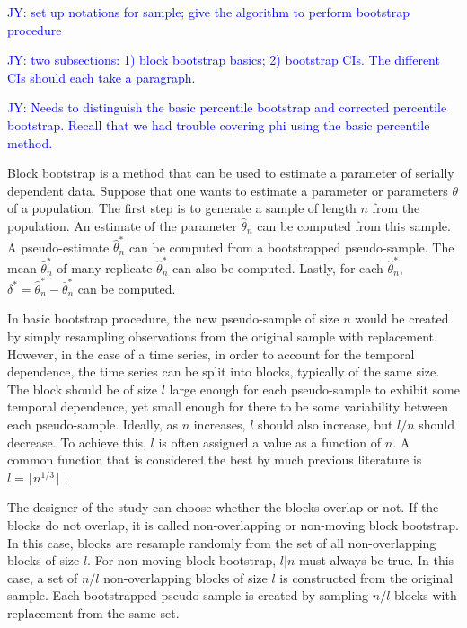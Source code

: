 \documentclass[12pt, letterpaper, titlepage]{article}
\newcommand{\jy}[1]{\textcolor{blue}{JY: #1}}
\begin{document}
\jy{set up notations for sample; give the algorithm to perform bootstrap
  procedure}

\jy{two subsections: 1) block bootstrap basics; 2) bootstrap CIs. The different
  CIs should each take a paragraph.}

\jy{Needs to distinguish the basic percentile bootstrap and corrected percentile
  bootstrap. Recall that we had trouble covering phi using the basic percentile
  method.}


Block bootstrap is a method that can be used to estimate a parameter of
serially dependent data. Suppose that one wants to estimate a parameter or
parameters $\theta$ of a population. The first step is to generate a sample of
length $n$ from the population. An estimate of the parameter
$\hat{\theta}_{n}$ can be computed from this sample. A pseudo-estimate
$\hat\theta_n^*$ can be computed from a bootstrapped pseudo-sample. The mean
$\bar\theta_n^*$ of many replicate $\hat\theta_n^*$ can also be computed.
Lastly, for each $\hat\theta_n^*$, $\delta^* = \hat\theta_n^* -
\bar\theta_n^*$ can be computed.


In basic bootstrap procedure, the new pseudo-sample of size $n$ would be
created by simply resampling observations from the original sample with
replacement. However, in the case of a time series, in order to account for
the temporal dependence, the time series can be split into blocks, typically
of the same size. The block should be of size $l$ large enough for each
pseudo-sample to exhibit some temporal dependence, yet small enough for there
to be some variability between each pseudo-sample. Ideally, as $n$ increases,
$l$ should also increase, but $l / n$ should decrease. To achieve this, $l$ is
often assigned a value as a function of $n$. A common function that is
considered the best by much previous literature is $l = \lceil n^{1/3} \rceil$
\citep{buhlmann1999block}.


The designer of the study can choose whether the blocks overlap or not. If the
blocks do not overlap, it is called non-overlapping or non-moving block
bootstrap. In this case, blocks are resample randomly from the set of all
non-overlapping blocks of size $l$. For non-moving block bootstrap, $l \vert n$
must always be true. In this case, a set of $n / l$ non-overlapping blocks of
size $l$ is constructed from the original sample. Each bootstrapped
pseudo-sample is created by sampling $n / l$ blocks with replacement from the
same set.
\end{document}
